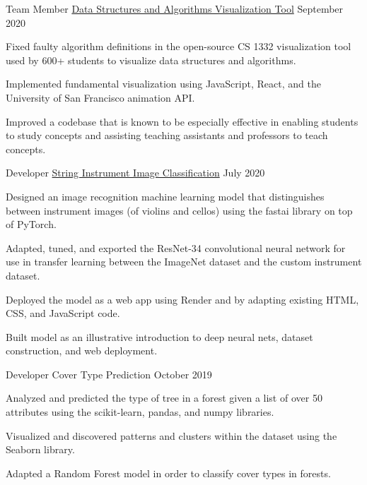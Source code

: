 \begin{cventries}
\cvproject
{Team Member} %
{
    \href{https://github.com/RodrigoDLPontes/visualization-tool}
    {Data Structures and Algorithms Visualization Tool}
} %
{} %
{September 2020} %
{ %
\begin{cvitems}
\item Fixed faulty algorithm definitions in the open-source CS 1332 visualization tool
used by 600+ students to visualize data structures and algorithms.
\item Implemented fundamental visualization using JavaScript, React,
and the University of San Francisco animation API.
\item Improved a codebase that is known to be especially effective
in enabling students to study concepts and assisting teaching assistants and professors to teach concepts.
\end{cvitems}
}

\cvproject
{Developer} %
{
    \href{https://github.com/hzhu359/fastai-v3}
    {String Instrument Image Classification}
} %
{} %
{July 2020} %
{ %
\begin{cvitems}
\item Designed an image recognition machine learning model
that distinguishes between instrument images (of violins and cellos)
using the fastai library on top of PyTorch.
\item Adapted, tuned, and exported the ResNet-34 convolutional neural network for use in transfer learning between the ImageNet dataset and the custom instrument dataset.
\item Deployed the model as a web app using Render and by adapting existing HTML, CSS, and JavaScript code.
\item Built model as an illustrative introduction to deep neural nets, dataset construction, and web deployment. 
\end{cvitems}
}

\cvproject
{Developer} %
{Cover Type Prediction} %
{} %
{October 2019} %
{ %
\begin{cvitems}
\item Analyzed and predicted the type of tree in a forest given a list of over 50 attributes
using the scikit-learn, pandas, and numpy libraries.
\item Visualized and discovered patterns and clusters within the dataset using the Seaborn library.
\item Adapted a Random Forest model in order to classify cover types in forests.
\end{cvitems}
}


\end{cventries}
